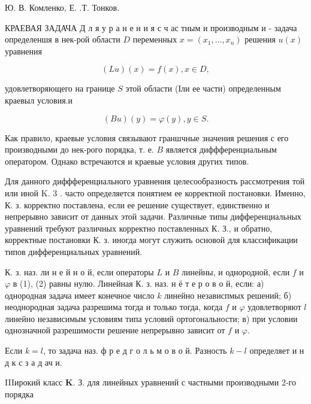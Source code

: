 \documentclass[10pt]{article}
\begin{document}
Ю. В. Комленко, Е. .Т. Тонков.



КРАЕВАЯ ЗАДАЧА Д л я у р а н е н и я с ч ас тным и производным и - задача определеншя в нек-рой области $D$ переменных $x=\left(x_{1}, \ldots, x_{n}\right)$ решения $u(x)$ уравнения



\[

(L u)(x)=f(x), x \in D,

\]



удовлетворяющего на границе $S$ этой области (Іли ее части) определенным краевыл условия.и



\[

(B u)(y)=\varphi(y), y \in S .

\]



Как правило, краевые условия связывают граншчные значения решения с его производными до нек-рого порядка, т. е. $B$ является диффференциальным оператором. Однако встречаются и краевые условия других типов.



Для данного диффференциального уравнения целесообразность рассмотрения той или иной $\mathrm{K}$. 3 . часто определяется понятием ее корректной постановки. Именно, К. з. корректно поставлена, если ее решение существует, единственно и непрерывно зависит от данных этой задачи. Различные типы дифференциальных уравнений требуют различных корректно поставленных К. З., и обратно, корректные постановки К. з. иногда могут служить основой для классификации типов дифференциальных уравнений.



К. з. наз. ли н е й н о й, если операторы $L$ и $B$ линейны, и однородной, если $f$ и $\varphi$ в (1), (2) равны нулю. Линейная К. з. наз. н ё т е р о в о й, если: а) однородная задача имеет конечное число $k$ линейно независпмых решений; б) неоднородная задача разрешима тогда и только тогда, когда $f$ и $\varphi$ удовлетворяют $l$ линейно независимым условиям типа условий ортогональности; в) при условии однозначной разрешимости решение непрерывно зависит от $f$ и $\varphi$.



Если $k=l$, то задача наз. ф р е д г о л ь м о в о й. Разность $k-l$ определяет и н д к с з а д ач и.



IIIирокий класс $\mathbf{K}$. З. для линейных уравнений с частными производными 2-го порядка
\end{document}
